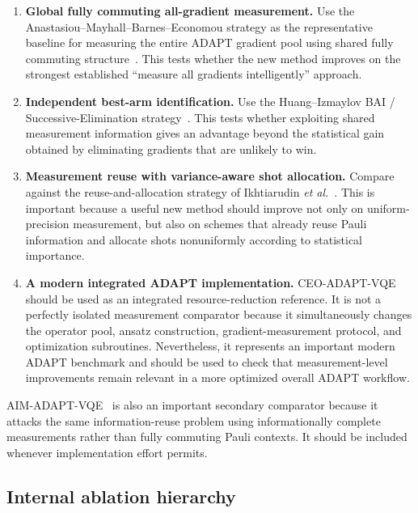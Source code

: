 \documentclass[11pt]{article}
\begin{document}
\begin{enumerate}[leftmargin=2.2em]
    \item \textbf{Global fully commuting all-gradient measurement.}
    Use the Anastasiou--Mayhall--Barnes--Economou strategy as the representative baseline for measuring the entire ADAPT gradient pool using shared fully commuting structure~\cite{Anastasiou2023}.  This tests whether the new method improves on the strongest established ``measure all gradients intelligently'' approach.

    \item \textbf{Independent best-arm identification.}
    Use the Huang--Izmaylov BAI / Successive-Elimination strategy~\cite{Huang2026}.  This tests whether exploiting shared measurement information gives an advantage beyond the statistical gain obtained by eliminating gradients that are unlikely to win.

    \item \textbf{Measurement reuse with variance-aware shot allocation.}
    Compare against the reuse-and-allocation strategy of Ikhtiarudin \emph{et al.}~\cite{Ikhtiarudin2025}.  This is important because a useful new method should improve not only on uniform-precision measurement, but also on schemes that already reuse Pauli information and allocate shots nonuniformly according to statistical importance.

    \item \textbf{A modern integrated ADAPT implementation.}
    CEO-ADAPT-VQE~\cite{Ramoa2025CEO} should be used as an integrated resource-reduction reference.  It is not a perfectly isolated measurement comparator because it simultaneously changes the operator pool, ansatz construction, gradient-measurement protocol, and optimization subroutines.  Nevertheless, it represents an important modern ADAPT benchmark and should be used to check that measurement-level improvements remain relevant in a more optimized overall ADAPT workflow.
\end{enumerate}

AIM-ADAPT-VQE~\cite{Nykanen2025} is also an important secondary comparator because it attacks the same information-reuse problem using informationally complete measurements rather than fully commuting Pauli contexts.  It should be included whenever implementation effort permits.

\subsection{Internal ablation hierarchy}
\end{document}
